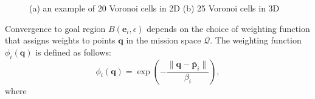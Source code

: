         \begin{figure}[H]
            \centering
            \caption{
                (a) an example of 20 Voronoi cells in 2D \cite{Voronoi2d} (b) 25 Voronoi cells in 3D \cite{Voronoi3d}
            }
            \label{fig:voronoi_diagrams}
        \end{figure}

        Convergence to goal region $B(\mathbf{e}_i, \epsilon)$ depends on the choice of weighting function that assigns weights to points $\mathbf{q}$ in the mission space $\mathcal{Q}$.
        The weighting function $\phi_i(\mathbf{q})$ is defined as follows: 
        \begin{equation}
            \phi_i(\mathbf{q}) = \exp\left(-\frac{\|\mathbf{q} - \mathbf{\bar{p}}_i\|}{\beta_i}\right),
        \end{equation}
        where 
        
